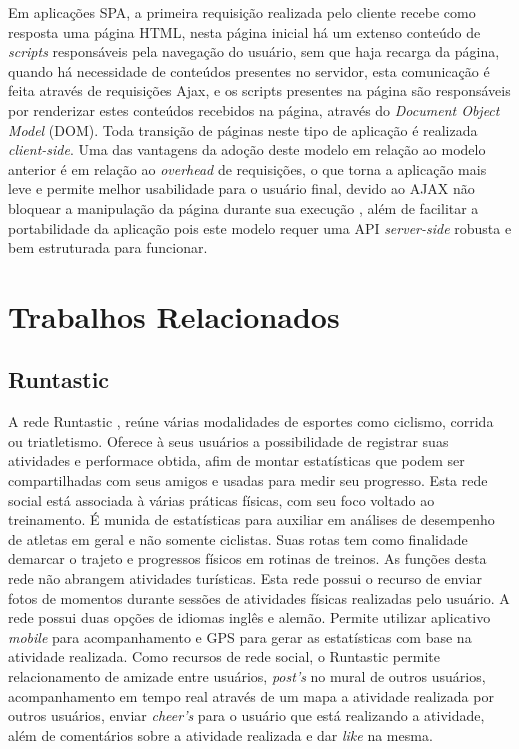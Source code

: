 Em aplicações SPA, a primeira requisição realizada pelo cliente recebe como resposta uma página HTML, nesta página inicial há um extenso conteúdo de
\textit{scripts} responsáveis pela navegação do usuário, sem que haja recarga da página, quando há necessidade de conteúdos presentes no servidor, 
esta comunicação é feita através de requisições Ajax, e os scripts presentes na página são responsáveis por renderizar estes conteúdos recebidos na
página, através do \textit{Document Object Model} (DOM). Toda transição de páginas neste tipo de aplicação é realizada \textit{client-side}. 
Uma das vantagens da adoção deste modelo em relação ao modelo anterior é em relação ao \textit{overhead} de requisições, o que torna a aplicação 
mais leve e permite melhor usabilidade para o usuário final, devido ao AJAX não bloquear a manipulação da página durante sua execução \cite{spa01}, 
além de facilitar a portabilidade da aplicação pois este modelo requer uma API \textit{server-side} robusta e bem estruturada para funcionar.

\section{Trabalhos Relacionados}
\subsection{Runtastic}
A rede Runtastic \cite{runtastic}, reúne várias modalidades de esportes como ciclismo, corrida ou triatletismo. Oferece à seus usuários a
possibilidade de registrar suas atividades e performace obtida, afim de montar estatísticas que podem ser compartilhadas com seus amigos e usadas 
para medir seu progresso. Esta rede social está associada à várias práticas físicas, com seu foco voltado ao treinamento. É munida de estatísticas 
para auxiliar em análises de desempenho de atletas em geral e não somente ciclistas. Suas rotas tem como finalidade demarcar o trajeto e progressos 
físicos em rotinas de treinos. As funções desta rede não abrangem atividades turísticas. Esta rede possui o recurso de enviar fotos de momentos 
durante sessões de atividades físicas realizadas pelo usuário. A rede  possui duas opções de idiomas inglês e alemão. Permite utilizar aplicativo 
\textit{mobile} para acompanhamento e GPS para gerar as estatísticas com base na atividade realizada. Como recursos de rede social, o Runtastic 
permite relacionamento de amizade entre usuários, \textit{post's} no mural de outros usuários, acompanhamento em tempo real através de um mapa a 
atividade realizada por outros usuários, enviar \textit{cheer's} para o usuário que está realizando a atividade, além de comentários sobre a 
atividade realizada e dar \textit{like} na mesma. 

